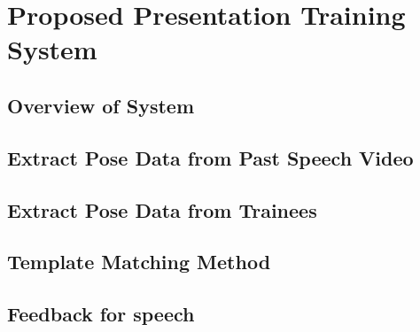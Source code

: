 \chapter{Proposed Presentation Training System}

\section{Overview of System}
\section{Extract Pose Data from Past Speech Video}
\section{Extract Pose Data from Trainees}
\section{Template Matching Method}
\section{Feedback for speech}
